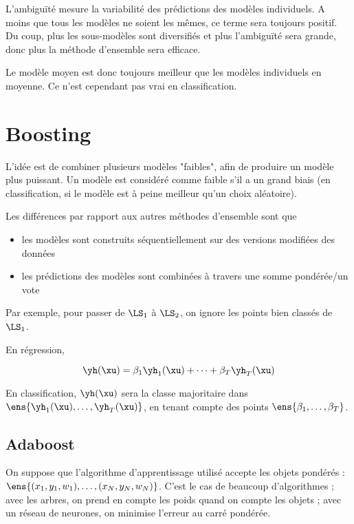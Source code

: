 L'ambiguïté mesure la variabilité des prédictions des modèles individuels. A moins que tous les modèles ne soient les mêmes, ce terme sera toujours positif. Du coup, plus les sous-modèles sont diversifiés et plus l'ambiguïté sera grande, donc plus la méthode d'ensemble sera efficace.

Le modèle moyen est donc toujours meilleur que les modèles individuels en moyenne. Ce n'est cependant pas vrai en classification.
	
\section{Boosting}
	
L'idée est de combiner plusieurs modèles "faibles", afin de produire un modèle plus puissant. Un modèle est considéré comme faible s'il a un grand biais (en classification, si le modèle est à peine meilleur qu'un choix aléatoire).

Les différences par rapport aux autres méthodes d'ensemble sont que

\begin{itemize}
	\item les modèles sont construits séquentiellement sur des versions modifiées des données
	\item les prédictions des modèles sont combinées à travers une somme pondérée/un vote
\end{itemize}


Par exemple, pour passer de $\LS_1$ à $\LS_2$, on ignore les points bien classés de $\LS_1$.

En régression,

$$\yh(\xu) = \beta_1\yh_1(\xu) + \dots + \beta_T \yh_T(\xu)$$

En classification, $\yh(\xu)$ sera la classe majoritaire dans $\ens{\yh_1(\xu), \dots , \yh_T(\xu)}$, en tenant compte des points $\ens{\beta_1, \dots , \beta_T}$.

	\subsection{Adaboost}
	
	On suppose que l'algorithme d'apprentissage utilisé accepte les objets pondérés : $\ens{(x_1, y_1, w_1), \dots , (x_N, y_N, w_N)}$. C'est le cas de beaucoup d'algorithmes ; avec les arbres, on prend en compte les poids quand on compte les objets ; avec un réseau de neurones, on minimise l'erreur au carré pondérée.
	
